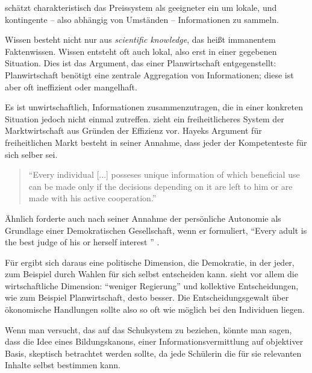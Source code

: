 \citeauthor{hayek-1945} schätzt charakteristisch das Preissystem als geeigneter ein um lokale, und kontingente -- also abhängig von Umständen -- Informationen zu sammeln.

Wissen besteht nicht nur aus \emph{scientific knowledge}, das heißt immanentem Faktenwissen.
Wissen entsteht oft auch lokal, also erst in einer gegebenen Situation.
Dies ist das Argument, das \citeauthor{hayek-1945} einer Planwirtschaft entgegenstellt:
Planwirtschaft benötigt eine zentrale Aggregation von Informationen; diese ist aber oft ineffizient oder mangelhaft.

Es ist unwirtschaftlich, Informationen zusammenzutragen, die in einer konkreten Situation jedoch nicht einmal zutreffen.
\citeauthor{hayek-1945} zieht ein freiheitlicheres System der Marktwirtschaft aus Gründen der Effizienz vor.
Hayeks Argument für freiheitlichen Markt besteht in seiner Annahme, dass jeder der Kompetenteste für sich selber sei.

\begin{quote}
	``Every individual [...] posseses unique information of which beneficial use can be made only if the decisions depending on it are left to him or are made with his active cooperation.'' \parencite[521]{Hayek-1945}
\end{quote}

Ähnlich forderte \citeauthor{Dahl-1989-aa} auch nach seiner Annahme der persönliche Autonomie als Grundlage einer Demokratischen Gesellschaft, wenn er formuliert,
``Every adult is the best judge of his or herself interest '' \parencite[100]{Dahl-1989-aa}.

Für \citeauthor{Dahl-1989-aa} ergibt sich daraus eine politische Dimension, die Demokratie, in der jeder, zum Beispiel durch Wahlen für sich selbst entscheiden kann.
\citeauthor{hayek-1945} sieht vor allem die wirtschaftliche Dimension: ``weniger Regierung'' \parencite[527f.]{hayek-1945} und kollektive Entscheidungen, wie zum Beispiel Planwirtschaft, desto besser.
Die Entscheidungsgewalt über ökonomische Handlungen sollte also so oft wie möglich bei den Individuen liegen.

Wenn man versucht, das auf das Schulsystem zu beziehen, könnte man sagen, dass die Idee eines Bildungskanons, einer Informationsvermittlung auf objektiver Basis, skeptisch betrachtet werden sollte, da jede Schülerin die für sie relevanten Inhalte selbst bestimmen kann.
